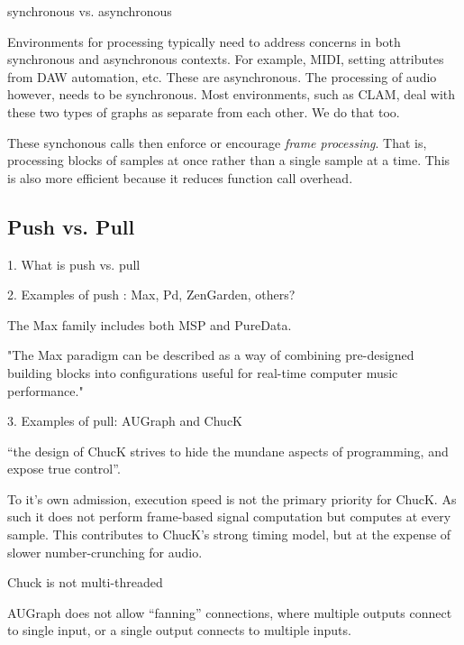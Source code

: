 \documentclass[twoside,a4paper]{article}
\begin{document}
synchronous vs. asynchronous


Environments for processing typically need to address concerns in both synchronous and asynchronous contexts.  For example, MIDI, setting attributes from DAW automation, etc.  These are asynchronous.  The processing of audio however, needs to be synchronous.  Most environments, such as CLAM, deal with these two types of graphs as separate from each other.  We do that too.

These synchonous calls then enforce or encourage \emph{frame processing}.  That is, processing blocks of samples at once rather than a single sample at a time.  This is also more efficient because it reduces function call overhead.



\subsection{Push vs. Pull} %

1. What is push vs. pull

2. Examples of push : Max, Pd, ZenGarden, others? 

The Max family includes both MSP\cite{Zicarelli:1998} and PureData\cite{Puckette:1996}.

"The Max paradigm can be described as a way of combining pre-designed building blocks into configurations useful for real-time computer music performance."\cite{Puckette:2002_max_at_17}


3. Examples of pull: AUGraph and ChucK


``the design of ChucK strives to hide the mundane aspects of programming, and expose true control''\cite{wang:2008}.

To it's own admission, execution speed is not the primary priority for ChucK.  As such it does not perform frame-based signal computation but computes at every sample.  This contributes to ChucK's strong timing model, but at the expense of slower number-crunching for audio.


Chuck is not multi-threaded

AUGraph does not allow ``fanning'' connections, where multiple outputs connect to single input, or a single output connects to multiple inputs.
\end{document}
